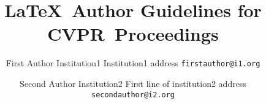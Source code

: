 \documentclass[runningheads]{llncs}
\def\confName{CVPR}
\def\\{}%
\begin{document}
\title{\LaTeX\ Author Guidelines for \confName~Proceedings}

\author{First Author\\
Institution1\\
Institution1 address\\
{\tt\small firstauthor@i1.org}
\and
Second Author\\
Institution2\\
First line of institution2 address\\
{\tt\small secondauthor@i2.org}
}
\maketitle
    



{
    \small

    
}

% 
\end{document}
